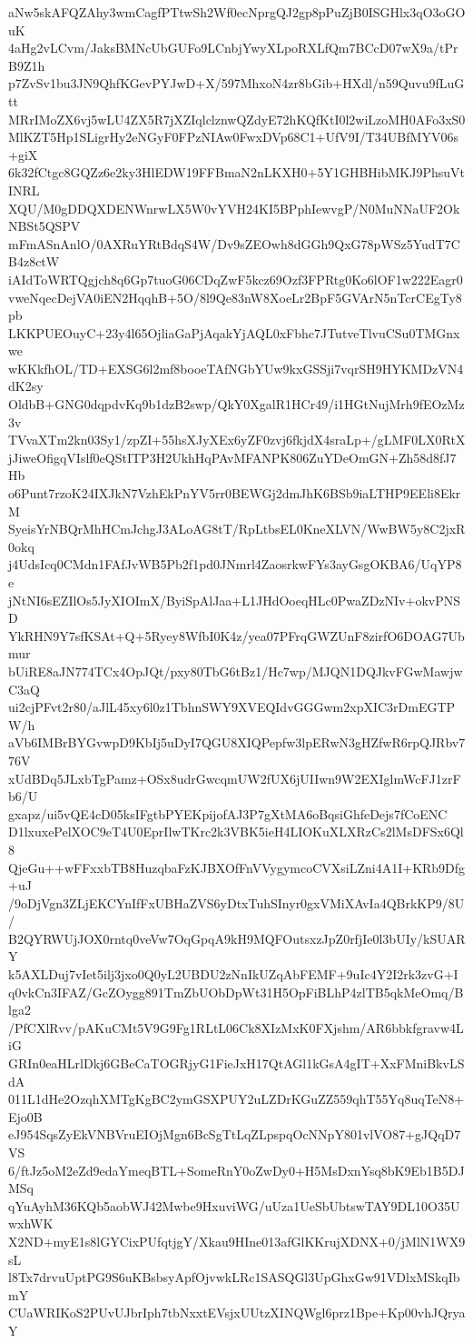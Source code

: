 aNw5skAFQZAhy3wmCagfPTtwSh2Wf0ecNprgQJ2gp8pPuZjB0ISGHlx3qO3oGOuK
4aHg2vLCvm/JaksBMNcUbGUFo9LCnbjYwyXLpoRXLfQm7BCcD07wX9a/tPrB9Z1h
p7ZvSv1bu3JN9QhfKGevPYJwD+X/597MhxoN4zr8bGib+HXdl/n59Quvu9fLuGtt
MRrIMoZX6vj5wLU4ZX5R7jXZIqlclznwQZdyE72hKQfKtI0l2wiLzoMH0AFo3xS0
MlKZT5Hp1SLigrHy2eNGyF0FPzNIAw0FwxDVp68C1+UfV9I/T34UBfMYV06s+giX
6k32fCtgc8GQZz6e2ky3HlEDW19FFBmaN2nLKXH0+5Y1GHBHibMKJ9PhsuVtINRL
XQU/M0gDDQXDENWnrwLX5W0vYVH24KI5BPphIewvgP/N0MuNNaUF2OkNBSt5QSPV
mFmASnAnlO/0AXRuYRtBdqS4W/Dv9sZEOwh8dGGh9QxG78pWSz5YudT7CB4z8ctW
iAIdToWRTQgjch8q6Gp7tuoG06CDqZwF5kcz69Ozf3FPRtg0Ko6lOF1w222Eagr0
vweNqecDejVA0iEN2HqqhB+5O/8l9Qe83nW8XoeLr2BpF5GVArN5nTcrCEgTy8pb
LKKPUEOuyC+23y4l65OjliaGaPjAqakYjAQL0xFbhc7JTutveTlvuCSu0TMGnxwe
wKKkfhOL/TD+EXSG6l2mf8booeTAfNGbYUw9kxGSSji7vqrSH9HYKMDzVN4dK2sy
OldbB+GNG0dqpdvKq9b1dzB2swp/QkY0XgalR1HCr49/i1HGtNujMrh9fEOzMz3v
TVvaXTm2kn03Sy1/zpZI+55hsXJyXEx6yZF0zvj6fkjdX4sraLp+/gLMF0LX0RtX
jJiweOfigqVIslf0eQStITP3H2UkhHqPAvMFANPK806ZuYDeOmGN+Zh58d8fJ7Hb
o6Punt7rzoK24IXJkN7VzhEkPnYV5rr0BEWGj2dmJhK6BSb9iaLTHP9EEli8EkrM
SyeisYrNBQrMhHCmJchgJ3ALoAG8tT/RpLtbsEL0KneXLVN/WwBW5y8C2jxR0okq
j4UdsIcq0CMdn1FAfJvWB5Pb2f1pd0JNmrl4ZaosrkwFYs3ayGsgOKBA6/UqYP8e
jNtNI6sEZIlOs5JyXIOImX/ByiSpAlJaa+L1JHdOoeqHLc0PwaZDzNIv+okvPNSD
YkRHN9Y7sfKSAt+Q+5Ryey8WfbI0K4z/yea07PFrqGWZUnF8zirfO6DOAG7Ubmur
bUiRE8aJN774TCx4OpJQt/pxy80TbG6tBz1/Hc7wp/MJQN1DQJkvFGwMawjwC3aQ
ui2cjPFvt2r80/aJlL45xy6l0z1TbhnSWY9XVEQIdvGGGwm2xpXIC3rDmEGTPW/h
aVb6IMBrBYGvwpD9KbIj5uDyI7QGU8XIQPepfw3lpERwN3gHZfwR6rpQJRbv776V
xUdBDq5JLxbTgPamz+OSx8udrGwcqmUW2fUX6jUIIwn9W2EXIglmWcFJ1zrFb6/U
gxapz/ui5vQE4cD05ksIFgtbPYEKpijofAJ3P7gXtMA6oBqsiGhfeDejs7fCoENC
D1lxuxePelXOC9eT4U0EprIlwTKrc2k3VBK5ieH4LIOKuXLXRzCs2lMsDFSx6Ql8
QjeGu++wFFxxbTB8HuzqbaFzKJBXOfFnVVygymcoCVXsiLZni4A1I+KRb9Dfg+uJ
/9oDjVgn3ZLjEKCYnIfFxUBHaZVS6yDtxTuhSInyr0gxVMiXAvIa4QBrkKP9/8U/
B2QYRWUjJOX0rntq0veVw7OqGpqA9kH9MQFOutsxzJpZ0rfjIe0l3bUIy/kSUARY
k5AXLDuj7vIet5ilj3jxo0Q0yL2UBDU2zNnIkUZqAbFEMF+9uIc4Y2I2rk3zvG+I
q0vkCn3IFAZ/GcZOygg891TmZbUObDpWt31H5OpFiBLhP4zlTB5qkMeOmq/Blga2
/PfCXlRvv/pAKuCMt5V9G9Fg1RLtL06Ck8XIzMxK0FXjshm/AR6bbkfgravw4LiG
GRIn0eaHLrlDkj6GBeCaTOGRjyG1FieJxH17QtAGl1kGsA4gIT+XxFMniBkvLSdA
011L1dHe2OzqhXMTgKgBC2ymGSXPUY2uLZDrKGuZZ559qhT55Yq8uqTeN8+Ejo0B
eJ954SqsZyEkVNBVruEIOjMgn6BcSgTtLqZLpspqOcNNpY801vlVO87+gJQqD7VS
6/ftJz5oM2eZd9edaYmeqBTL+SomeRnY0oZwDy0+H5MsDxnYsq8bK9Eb1B5DJMSq
qYuAyhM36KQb5aobWJ42Mwbe9HxuviWG/uUza1UeSbUbtswTAY9DL10O35UwxhWK
X2ND+myE1s8lGYCixPUfqtjgY/Xkau9HIne013afGlKKrujXDNX+0/jMlN1WX9sL
l8Tx7drvuUptPG9S6uKBsbsyApfOjvwkLRc1SASQGl3UpGhxGw91VDlxMSkqIbmY
CUaWRIKoS2PUvUJbrIph7tbNxxtEVsjxUUtzXINQWgl6prz1Bpe+Kp00vhJQryaY
